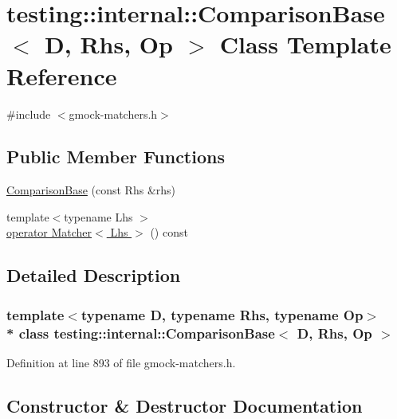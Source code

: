 \hypertarget{classtesting_1_1internal_1_1_comparison_base}{}\section{testing\+:\+:internal\+:\+:Comparison\+Base$<$ D, Rhs, Op $>$ Class Template Reference}
\label{classtesting_1_1internal_1_1_comparison_base}


{\ttfamily \#include $<$gmock-\/matchers.\+h$>$}

\subsection*{Public Member Functions}
\begin{DoxyCompactItemize}
\item 
\hyperlink{classtesting_1_1internal_1_1_comparison_base_a365f20e35a604195c869ec0c0bc4c3a3}{Comparison\+Base} (const Rhs \&rhs)
\item 
{\footnotesize template$<$typename Lhs $>$ }\\\hyperlink{classtesting_1_1internal_1_1_comparison_base_a7d329851ff6ecffebe8c1e332504bad3}{operator Matcher$<$ Lhs $>$} () const 
\end{DoxyCompactItemize}


\subsection{Detailed Description}
\subsubsection*{template$<$typename D, typename Rhs, typename Op$>$\\*
class testing\+::internal\+::\+Comparison\+Base$<$ D, Rhs, Op $>$}



Definition at line 893 of file gmock-\/matchers.\+h.



\subsection{Constructor \& Destructor Documentation}
